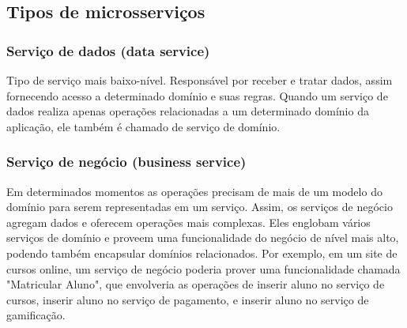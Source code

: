 
\subsection{Tipos de microsserviços}

\subsubsection{Serviço de dados (data service)}
Tipo de serviço mais baixo-nível. Responsável por receber e tratar dados, assim fornecendo acesso a determinado domínio e suas regras. Quando um serviço de dados realiza apenas operações relacionadas a um determinado domínio da aplicação, ele também é chamado de serviço de domínio.

\subsubsection{Serviço de negócio (business service)}
Em determinados momentos as operações precisam de mais de um modelo do domínio para serem representadas em um serviço. Assim, os serviços de negócio agregam dados e oferecem operações mais complexas. Eles englobam vários serviços de domínio e proveem uma funcionalidade do negócio de nível mais alto, podendo também encapsular domínios relacionados. Por exemplo, em um site de cursos online, um serviço de negócio poderia prover uma funcionalidade chamada "Matricular Aluno", que envolveria as operações de inserir aluno no serviço de cursos, inserir aluno no serviço de pagamento, e inserir aluno no serviço de gamificação.

